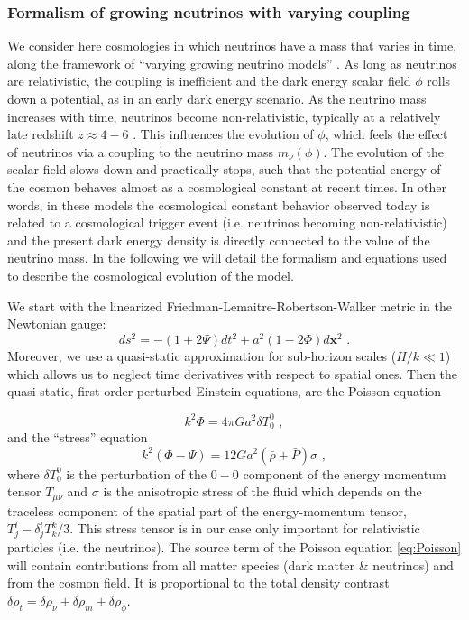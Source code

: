\subsubsection{Formalism of growing neutrinos with varying coupling}

We consider here cosmologies in which neutrinos have a mass that varies
in time, along the framework of ``varying growing neutrino models''
\cite{wetterich_growing_2007}. As long as neutrinos are relativistic,
the coupling is inefficient and the dark energy scalar field $\phi$
rolls down a potential, as in an early dark energy scenario. As the
neutrino mass increases with time, neutrinos become non-relativistic,
typically at a relatively late redshift $z\approx4-6$ \cite{pettorino_neutrino_2010}.
This influences the evolution of $\phi$, which feels the effect of
neutrinos via a coupling to the neutrino mass $m_{\nu}(\phi)$. The
evolution of the scalar field slows down and practically stops, such
that the potential energy of the cosmon behaves almost as a cosmological
constant at recent times. In other words, in these models the cosmological
constant behavior observed today is related to a cosmological trigger
event (i.e. neutrinos becoming non-relativistic) and the present dark
energy density is directly connected to the value of the neutrino
mass. In the following we will detail the formalism and equations
used to describe the cosmological evolution of the model.

We start with the linearized Friedman-Lemaitre-Robertson-Walker metric
in the Newtonian gauge: 
\begin{equation}
ds^{2}=-(1+2\Psi)dt^{2}+a^{2}(1-2\Phi)d\mathbf{x}^{2}\,\,.
\end{equation}
Moreover, we use a quasi-static approximation for sub-horizon scales
($H/k\ll1$) which allows us to neglect time derivatives with respect
to spatial ones. Then the quasi-static, first-order perturbed Einstein
equations, are the Poisson equation \cite{ma_cosmological_1994}

\begin{equation}
k^{2}\Phi=4\pi Ga^{2}\delta T_{0}^{0}\,\,,\label{eq:Poisson}
\end{equation}
and the ``stress'' equation 
\begin{equation}
k^{2}(\Phi-\Psi)=12Ga^{2}(\bar{\rho}+\bar{P})\sigma\,\,,\label{eq:stress-phipsi}
\end{equation}
where $\delta T_{0}^{0}$ is the perturbation of the $0-0$ component
of the energy momentum tensor $T_{\mu\nu}$ and $\sigma$ is the anisotropic
stress of the fluid which depends on the traceless component of the
spatial part of the energy-momentum tensor, $T_{j}^{i}-\delta_{j}^{i}T_{k}^{k}/3$.
This stress tensor is in our case only important for relativistic
particles (i.e. the neutrinos). The source term of the Poisson equation
\ref{eq:Poisson} will contain contributions from all matter
species (dark matter \& neutrinos) and from the cosmon field. It is
proportional to the total density contrast $\delta\rho_{t}=\delta\rho_{\nu}+\delta\rho_{m}+\delta\rho_{\phi}$.


